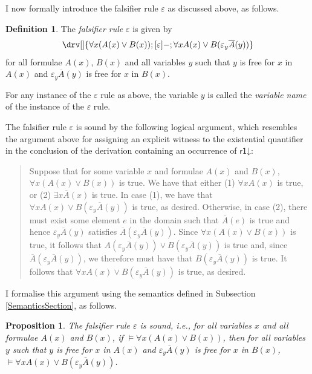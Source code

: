\documentclass[10pt]{article}
\newtheorem{proposition}[theorem]{Proposition}
\theoremstyle{definition}\newtheorem{remark}[theorem]{Remark}
\theoremstyle{definition}\newtheorem{example}[theorem]{Example}
\theoremstyle{definition}\newtheorem{definition}[theorem]{Definition}
\newcommand{\rOneDown}{{\mathsf{r1\mathord\downarrow}}}
\newcommand{\falsifierRule}{{\mathsf{\varepsilon}}}
\begin{document}
	I now formally introduce the falsifier rule $\falsifierRule$ as discussed above, as follows.
	
	\begin{definition}
		The \textit{falsifier rule} $\falsifierRule$ is given by
		\[
		\drv[] {
			\forall x (A(x) \lor B(x)) ; [\falsifierRule]- ; \forall x A(x) \lor B(\varepsilon_y \overline{A}(y))
		}
		\]
		for all formulae $A(x)$, $B(x)$ and all variables $y$ such that $y$ is free for $x$ in $A(x)$ and $\varepsilon_y \overline{A}(y)$ is free for $x$ in $B(x)$.
		
		For any instance of the $\falsifierRule$ rule as above, the variable $y$ is called the \textit{variable name} of the instance of the $\falsifierRule$ rule.
	\end{definition}

	The falsifier rule $\falsifierRule$ is sound by the following logical argument, which resembles the argument above for assigning an explicit witness to the existential quantifier in the conclusion of the derivation containing an occurrence of $\rOneDown$:
	
	\begin{quotation}
		Suppose that for some variable $x$ and formulae $A(x)$ and $B(x)$, $\forall x (A(x) \lor B(x))$ is true. We have that either (1) $\forall x A(x)$ is true, or (2) $\exists x \overline{A}(x)$ is true. In case (1), we have that $\forall x A(x) \lor B(\varepsilon_y \overline{A}(y))$ is true, as desired. Otherwise, in case (2), there must exist some element $e$ in the domain such that $\overline{A}(e)$ is true and hence $\varepsilon_y \overline{A}(y)$ satisfies $\overline{A}(\varepsilon_y \overline{A}(y))$. Since $\forall x (A(x) \lor B(x))$ is true, it follows that $A(\varepsilon_y \overline{A}(y)) \lor B(\varepsilon_y \overline{A}(y))$ is true and, since $\overline{A}(\varepsilon_y \overline{A}(y))$, we therefore must have that $B(\varepsilon_y \overline{A}(y))$ is true. It follows that $\forall x A(x) \lor B(\varepsilon_y \overline{A}(y))$ is true, as desired.
	\end{quotation}

	I formalise this argument using the semantics defined in Subsection \ref{SemanticsSection}, as follows.

	\begin{proposition}
		The falsifier rule $\falsifierRule$ is sound, i.e., for all variables $x$ and all formulae $A(x)$ and $B(x)$, if $\models \forall x (A(x) \lor B(x))$, then for all variables $y$ such that $y$ is free for $x$ in $A(x)$ and $\varepsilon_y \overline{A}(y)$ is free for $x$ in $B(x)$, $\models \forall x A(x) \lor B(\varepsilon_y \overline{A}(y))$.
	\end{proposition}
\end{document}
